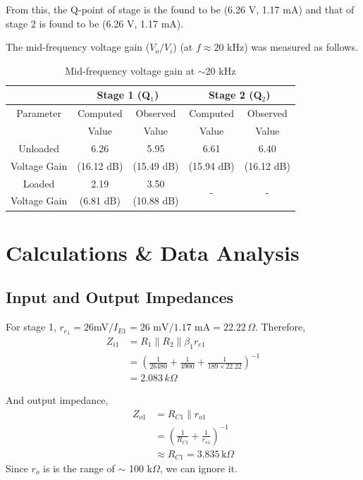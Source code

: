 From this, the Q-point of stage is the found to be (6.26 V, 1.17 mA) and that of stage 2 is found to be (6.26 V, 1.17 mA).

The mid-frequency voltage gain ($V_o/V_i$) (at $f \approx 20$ kHz) was measured as follows.

\begin{table}[H]
    \centering
    \begin{tabular}{|c|c|c|c|c|}
    \hline
     & \multicolumn{2}{|c|}{Stage 1 (Q$_1$)} & \multicolumn{2}{|c|}{Stage 2 (Q$_2$)} \\ \hline
    Parameter & Computed  & Observed  & Computed  & Observed\\
     &  Value &  Value &  Value &  Value\\ \hline
    Unloaded  & \multirow{1}{*}{6.26}  &  \multirow{1}{*}{5.95} & \multirow{1}{*}{6.61}  &  \multirow{1}{*}{6.40} \\
    Voltage Gain        & (16.12 dB)   & (15.49 dB)             & (15.94 dB)          &  (16.12 dB) \\ \hline
    Loaded & \multirow{1}{*}{2.19} & \multirow{1}{*}{3.50} & \multirow{2}{*}{-}  &  \multirow{2}{*}{-} \\
    Voltage Gain& (6.81 dB) & (10.88 dB)  & &   \\
    \hline
    \end{tabular}
    \caption{Mid-frequency voltage gain at $\sim$20 kHz}
    \label{tab:3}
\end{table}

\section{Calculations \& Data Analysis}

\subsection*{Input and Output Impedances}
For stage 1, $r_{e_1}=26$mV$/I_{E1}=26\text{ mV}/1.17\text{ mA}=22.22\,\Omega$. Therefore,
\begin{align*}
    Z_{i1} &= R_1 \parallel R_2 \parallel \beta_1 r_{e1}\\
    &= \left( \frac{1}{26480} + \frac{1}{4900} + \frac{1}{189 \times 22.22} \right)^{-1}\\
    &= 2.083\,k\Omega
\end{align*}

And output impedance,
\begin{align*}
    Z_{o1} &= R_{C1} \parallel r_{o1} \\
    &= \left( \frac{1}{R_{C1}}+\frac{1}{r_{o1}}\right)^{-1} \\
    &\approx R_{C1}=3.835\,\text{k}\Omega
\end{align*}
Since $r_o$ is is the range of $\sim$ 100 k$\Omega$, we can ignore it.


